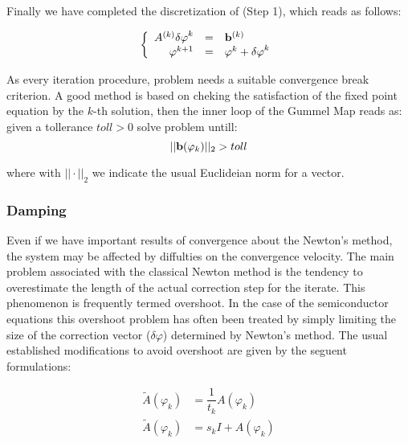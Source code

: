 Finally we have completed the discretization of (Step 1), which reads as follows:

\begin{equation}
\label{eq: NLP discretizated}
\left\{
\begin{array}{rcl}
A^{(k)}\mathbf{\delta \varphi}^k & = & \mathbf{b}^{(k)} \\
\mathbf{\varphi}^{k+1} & = & \mathbf{\varphi}^k +  \mathbf{\delta \varphi}^k 
\end{array}
\right.
\end{equation}

As every iteration procedure, problem  needs a suitable convergence break criterion. A good method is based on cheking the satisfaction of the fixed point equation  by the $k$-th solution, then the inner loop of the Gummel Map reads as: given a tollerance $toll>0$ solve problem  untill:
\begin{equation}
||\mathbf{b}(\varphi_k)||_2 > toll
\end{equation}

where with $||\cdot ||_2$ we indicate the usual Euclideian norm for a vector.
\subsubsection{Damping}

Even if we have important results of convergence about the Newton's method, the system  may be affected by diffulties on the convergence velocity.
The main problem associated with the classical Newton method is the tendency to overestimate the length of the actual correction step for the iterate. This phenomenon is frequently termed overshoot. In the case of the semiconductor equations this overshoot problem has often been treated by simply limiting the size of the correction vector ($\delta \varphi$) determined by Newton's method. The usual established modifications to avoid overshoot are given by the seguent formulations:


\begin{align}
\tilde{A}(\varphi_k)&=\dfrac{1}{t_k}A(\varphi_k) \label{eq: NLP mod used} \\
\tilde{A}(\varphi_k)&=s_kI+A(\varphi_k) \label{eq: NLP mod not used}
\end{align}

